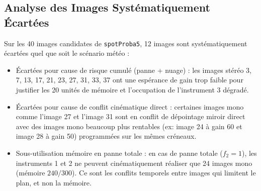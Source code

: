 \subsection{Analyse des Images Systématiquement Écartées}
Sur les 40 images candidates de \texttt{spotProba5}, 12 images sont systématiquement écartées quel que soit le scénario météo :
\begin{itemize}
    \item Écartées pour cause de risque cumulé (panne + nuage) : les images stéréo 3, 7, 13, 17, 21, 23, 27, 31, 33, 37 ont une espérance de gain trop faible pour justifier les 20 unités de mémoire et l'occupation de l'instrument 3 dégradé.
    \item Écartées pour cause de conflit cinématique direct : certaines images mono comme l'image 27 et l'image 31 sont en conflit de dépointage miroir direct avec des images mono beaucoup plus rentables (ex: image 24 à gain 60 et image 28 à gain 50) programmées sur les mêmes créneaux.
    \item Sous-utilisation mémoire en panne totale : en cas de panne totale ($f_2=1$), les instruments 1 et 2 ne peuvent cinématiquement réaliser que 24 images mono (mémoire $240 / 300$). Ce sont les conflits temporels entre images qui limitent le plan, et non la mémoire.
\end{itemize}
